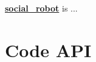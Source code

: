 

{\bfseries \hyperlink{namespacesocial__robot}{social\_\-robot}} is ...\hypertarget{main_codeapi}{}\section{Code API}\label{main_codeapi}
